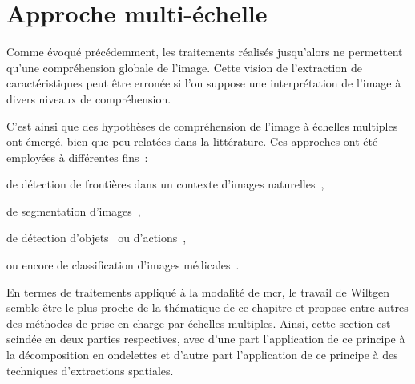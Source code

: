 \section{Approche multi-échelle}
Comme évoqué précédemment, les traitements réalisés jusqu'alors ne permettent qu'une compréhension globale de l'image. Cette vision de l'extraction de caractéristiques peut être erronée si l'on suppose une interprétation de l'image à divers niveaux de compréhension.\par

C'est ainsi que des hypothèses de compréhension de l'image à échelles multiples ont émergé, bien que peu relatées dans la littérature. Ces approches ont été employées à différentes fins~:
\begin{inlinerate}
    \item de détection de frontières dans un contexte d'images naturelles~\cite{Ren2008},
    \item de segmentation d'images~\cite{DosSantos2012,Arbelaez2014},
    \item de détection d'objets~\cite{Felzenszwalb2008} ou d'actions~\cite{Pedersoli2011},
    \item ou encore de classification d'images médicales~\cite{Alsaih2016,Tang2017}.
\end{inlinerate} En termes de traitements appliqué à la modalité de \gls{mcr}, le travail de Wiltgen~ semble être le plus proche de la thématique de ce chapitre et propose entre autres des méthodes de prise en charge par échelles multiples. Ainsi, cette section est scindée en deux parties respectives, avec d'une part l'application de ce principe à la décomposition en ondelettes et d'autre part l'application de ce principe à des techniques d'extractions spatiales.\par 

